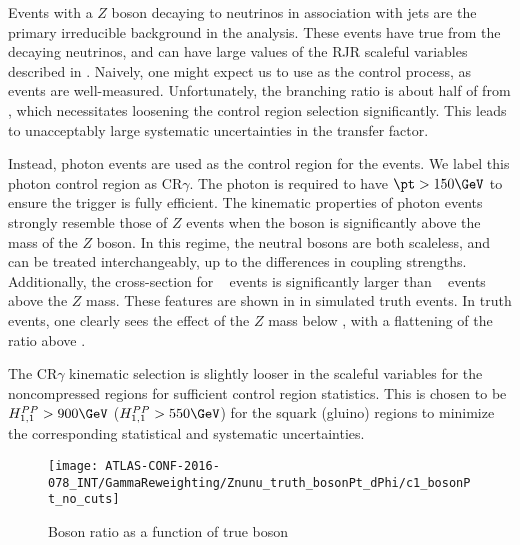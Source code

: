 

Events with a $Z$ boson decaying to neutrinos in association with jets are the primary irreducible background in the analysis.
These events have true \met from the decaying neutrinos, and can have large values of the RJR scaleful variables described in .
Naively, one might expect us to use \Zll as the control process, as \Zll events are well-measured.
Unfortunately, the \Zll branching ratio is about half of from \Zvv, which necessitates loosening the control region selection significantly.
This leads to unacceptably large systematic uncertainties in the transfer factor.

Instead, photon events are used as the control region for the \Zvv events.
We label this photon control region as CR$\gamma$.
The photon is required to have $\pt > 150 \GeV$ to ensure the trigger is fully efficient.
The kinematic properties of photon events strongly resemble those of $Z$ events when the boson \pt is significantly above the mass of the $Z$ boson.
In this regime, the neutral bosons are both scaleless, and can be treated interchangeably, up to the differences in coupling strengths.
Additionally, the cross-section for \gammajets~ events is significantly larger than \zjets~ events above the $Z$ mass.
These features are shown in  in simulated \Zvv truth events.
In truth events, one clearly sees the effect of the $Z$ mass below  \GeV, with a flattening of the ratio above  \GeV.

The CR$\gamma$ kinematic selection is slightly looser in the scaleful variables for the noncompressed regions for sufficient control region statistics.
This is chosen to be $\HFnm{PP}{1}{1} > 900 \GeV$ ($\HFnm{PP}{1}{1} > 550 \GeV$) for the squark (gluino) regions to minimize the corresponding statistical and systematic uncertainties.
\begin{figure}[tbp]
\caption{Boson \pt ratio as a function of true boson \pt} \label{fig:boson_pt_ratio}
\texttt{[image: ATLAS-CONF-2016-078\_INT/GammaReweighting/Znunu\_truth\_bosonPt\_dPhi/c1\_bosonPt\_no\_cuts]}
\end{figure}

